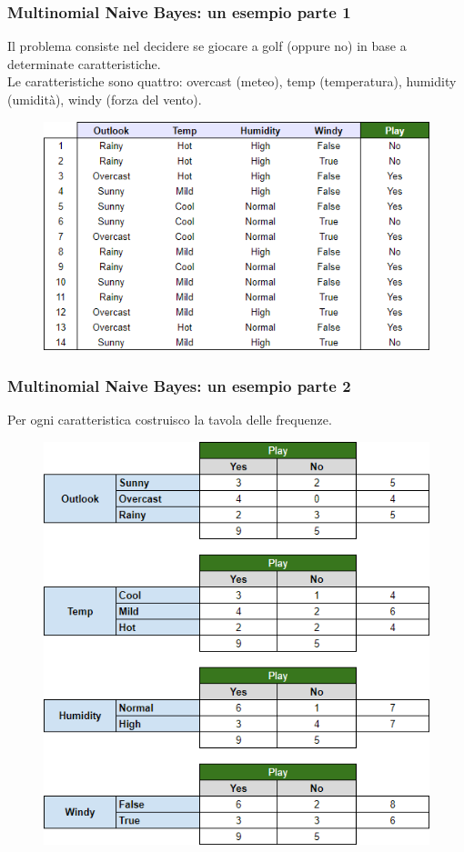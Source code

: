 \begin{frame}
	
	\frametitle{Multinomial Naive Bayes:  un esempio parte 1}	
	
	Il problema consiste nel decidere se giocare a golf (oppure no) in base a determinate caratteristiche.\\
	Le caratteristiche sono quattro: overcast (meteo), temp (temperatura), humidity (umidità), windy (forza del vento).
	\begin{figure}[!htbp]
		\centering
		\includegraphics[width=0.7\linewidth]{images/supervised/naive_bayes/naive-bayes-esempio-1.png}
	\end{figure}
	

\end{frame}


\begin{frame}
	
	\frametitle{Multinomial Naive Bayes:  un esempio parte 2}	
	
	Per ogni caratteristica costruisco la tavola delle frequenze.
	\begin{figure}[!htbp]
		\centering
		\includegraphics[width=0.5\linewidth]{images/supervised/naive_bayes/naive-bayes-esempio-2.png}
	\end{figure}
	

\end{frame}


